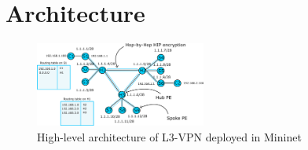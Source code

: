 \section{Architecture}
\label{section:architecture}


\begin{figure}[!h]
	\includegraphics[width=0.5\textwidth]{graphics/arch.png}
	\caption{High-level architecture of L3-VPN deployed in Mininet}
	\label{fig:arch}
\end{figure}

